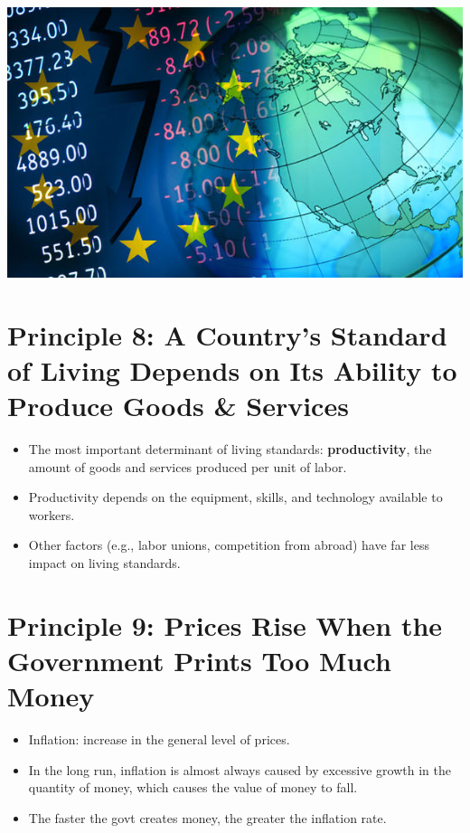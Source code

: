 \documentclass[
]{book}
\begin{document}
\includegraphics{images/lesson01/fig3.JPG}

\hypertarget{principle-8-a-countrys-standard-of-living-depends-on-its-ability-to-produce-goods-services}{%
\section{Principle 8: A Country's Standard of Living Depends on Its Ability to Produce Goods \& Services}\label{principle-8-a-countrys-standard-of-living-depends-on-its-ability-to-produce-goods-services}}

\begin{itemize}
\item
  The most important determinant of living standards: \textbf{productivity}, the amount of goods and services produced per unit of labor.
\item
  Productivity depends on the equipment, skills, and technology available to workers.
\item
  Other factors (e.g., labor unions, competition from abroad) have far less impact on living standards.
\end{itemize}

\hypertarget{principle-9-prices-rise-when-the-government-prints-too-much-money}{%
\section{Principle 9: Prices Rise When the Government Prints Too Much Money}\label{principle-9-prices-rise-when-the-government-prints-too-much-money}}

\begin{itemize}
\item
  Inflation: increase in the general level of prices.
\item
  In the long run, inflation is almost always caused by excessive growth in the quantity of money, which causes the value of money to fall.
\item
  The faster the govt creates money, the greater the inflation rate.
\end{itemize}
\end{document}
